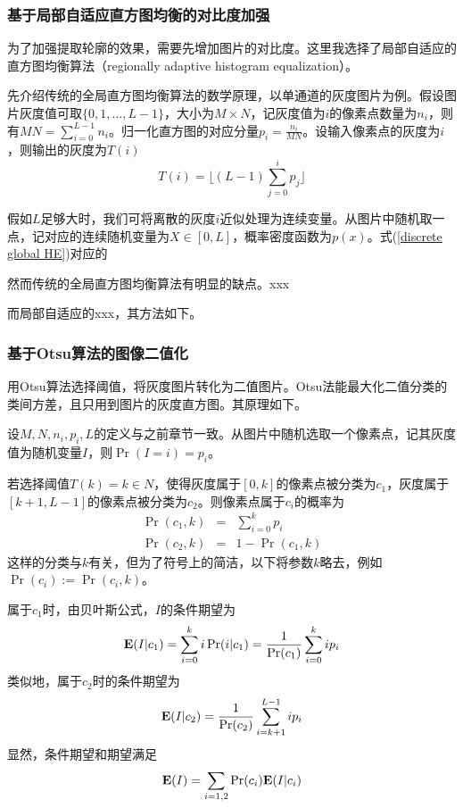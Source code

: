 \subsubsection{基于局部自适应直方图均衡的对比度加强}
为了加强提取轮廓的效果，需要先增加图片的对比度。这里我选择了局部自适应的直方图均衡算法（regionally adaptive histogram equalization）。

先介绍传统的全局直方图均衡算法的数学原理，以单通道的灰度图片为例。假设图片灰度值可取$\{0, 1, \dots, L-1\}$，大小为$M\times N$，记灰度值为$i$的像素点数量为$n_i$，则有$MN=\sum_{i=0}^{L-1}n_i$。归一化直方图的对应分量$p_i=\frac{n_i}{MN}$。设输入像素点的灰度为$i$，则输出的灰度为$T(i)$
\begin{equation}
    T(i) = \lfloor (L-1) \sum_{j=0}^i p_j \rfloor
    \label{discrete global HE}
\end{equation}

假如$L$足够大时，我们可将离散的灰度$i$近似处理为连续变量。从图片中随机取一点，记对应的连续随机变量为$X\in[0,L]$，概率密度函数为$p(x)$。式(\ref{discrete global HE})对应的

然而传统的全局直方图均衡算法有明显的缺点。xxx

而局部自适应的xxx，其方法如下。

\subsubsection{基于Otsu算法的图像二值化}
用Otsu算法选择阈值，将灰度图片转化为二值图片。Otsu法能最大化二值分类的类间方差，且只用到图片的灰度直方图。其原理如下。

设$M,N,n_i,p_i,L$的定义与之前章节一致。从图片中随机选取一个像素点，记其灰度值为随机变量$I$，则$\Pr(I=i)=p_i$。

若选择阈值$T(k)=k\in N$，使得灰度属于$[0,k]$的像素点被分类为$c_1$，灰度属于$[k+1,L-1]$的像素点被分类为$c_2$。则像素点属于$c_i$的概率为
\begin{eqnarray}
    \Pr(c_1,k) &=& \sum_{i=0}^k p_i \\ 
    \Pr(c_2,k) &=& 1 - \Pr(c_1,k)
\end{eqnarray}
这样的分类与$k$有关，但为了符号上的简洁，以下将参数$k$略去，例如$\Pr(c_i):=\Pr(c_i,k)$。

属于$c_1$时，由贝叶斯公式，$I$的条件期望为
\begin{equation}
    \mathbf{E}(I|c_1) = \sum_{i=0}^k i \Pr(i | c_1) 
    = \frac{1}{\Pr(c_1)} \sum_{i=0}^k i p_i
\end{equation}
类似地，属于$c_2$时的条件期望为
\begin{equation}
    \mathbf{E}(I|c_2) = \frac{1}{\Pr(c_2)} \sum_{i=k+1}^{L-1}i p_i
\end{equation}
显然，条件期望和期望满足
\begin{equation}
    \mathbf{E}(I) = \sum_{i=1,2} \Pr(c_i) \mathbf{E}(I|c_i)
\end{equation}

